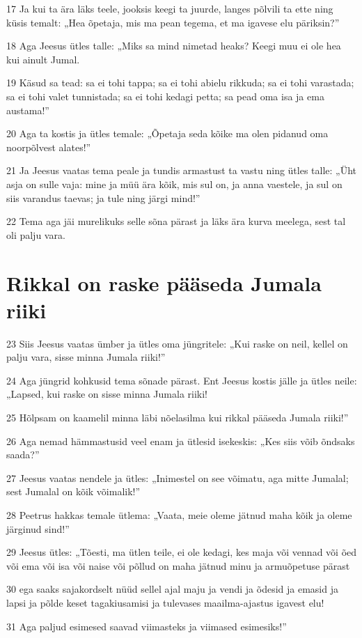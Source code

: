 \par 17 Ja kui ta ära läks teele, jooksis keegi ta juurde, langes põlvili ta ette ning küsis temalt: „Hea õpetaja, mis ma pean tegema, et ma igavese elu päriksin?”
\par 18 Aga Jeesus ütles talle: „Miks sa mind nimetad heaks? Keegi muu ei ole hea kui ainult Jumal.
\par 19 Käsud sa tead: sa ei tohi tappa; sa ei tohi abielu rikkuda; sa ei tohi varastada; sa ei tohi valet tunnistada; sa ei tohi kedagi petta; sa pead oma isa ja ema austama!”
\par 20 Aga ta kostis ja ütles temale: „Õpetaja seda kõike ma olen pidanud oma noorpõlvest alates!”
\par 21 Ja Jeesus vaatas tema peale ja tundis armastust ta vastu ning ütles talle: „Üht asja on sulle vaja: mine ja müü ära kõik, mis sul on, ja anna vaestele, ja sul on siis varandus taevas; ja tule ning järgi mind!”
\par 22 Tema aga jäi murelikuks selle sõna pärast ja läks ära kurva meelega, sest tal oli palju vara.

\section*{Rikkal on raske pääseda Jumala riiki}

\par 23 Siis Jeesus vaatas ümber ja ütles oma jüngritele: „Kui raske on neil, kellel on palju vara, sisse minna Jumala riiki!”
\par 24 Aga jüngrid kohkusid tema sõnade pärast. Ent Jeesus kostis jälle ja ütles neile: „Lapsed, kui raske on sisse minna Jumala riiki!
\par 25 Hõlpsam on kaamelil minna läbi nõelasilma kui rikkal pääseda Jumala riiki!”
\par 26 Aga nemad hämmastusid veel enam ja ütlesid isekeskis: „Kes siis võib õndsaks saada?”
\par 27 Jeesus vaatas nendele ja ütles: „Inimestel on see võimatu, aga mitte Jumalal; sest Jumalal on kõik võimalik!”
\par 28 Peetrus hakkas temale ütlema: „Vaata, meie oleme jätnud maha kõik ja oleme järginud sind!”
\par 29 Jeesus ütles: „Tõesti, ma ütlen teile, ei ole kedagi, kes maja või vennad või õed või ema või isa või naise või põllud on maha jätnud minu ja armuõpetuse pärast
\par 30 ega saaks sajakordselt nüüd sellel ajal maju ja vendi ja õdesid ja emasid ja lapsi ja põlde keset tagakiusamisi ja tulevases maailma-ajastus igavest elu!
\par 31 Aga paljud esimesed saavad viimasteks ja viimased esimesiks!”

